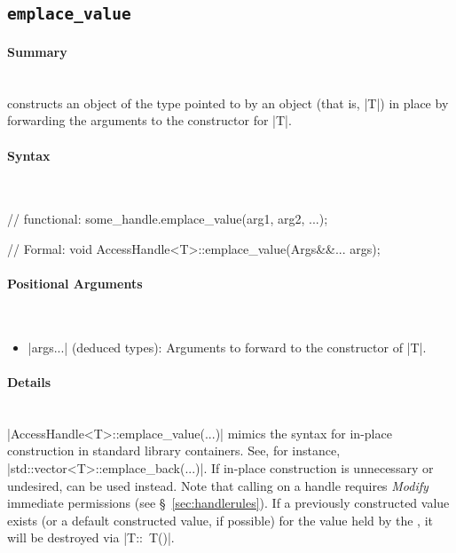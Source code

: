\subsection{\texttt{emplace\_value}}
\label{ssec:api_fe_emplace_value}

\paragraph{Summary}\mbox{}\\ 
 constructs an object of the type pointed to by an \ahandleT object
(that is, |T|) in place by forwarding the arguments to the constructor
for |T|.

\paragraph{Syntax}\mbox{}\\ 
\begin{CppCode}
// functional:
some_handle.emplace_value(arg1, arg2, ...);

// Formal:
void AccessHandle<T>::emplace_value(Args&&... args);
\end{CppCode}

\paragraph{Positional Arguments}\mbox{}\\ 
\begin{itemize}
  \item |args...| (deduced types):  Arguments to forward to the
  constructor of |T|.
\end{itemize}

\paragraph{Details}\mbox{}\\ 

|AccessHandle<T>::emplace_value(...)| mimics the syntax for in-place
construction in standard library containers.  See, for instance,
|std::vector<T>::emplace_back(...)|.  If in-place construction is
unnecessary or undesired,  can be used instead.  
Note that calling  on a \gls{handle} requires {\it
Modify} \gls{immediate permissions} (see \S~\ref{sec:handlerules}).  If a previously constructed value
exists (or a default constructed value, if possible) for the value held by the
, it will be destroyed via |T::~T()|.

